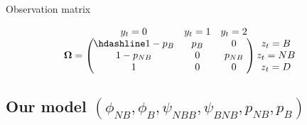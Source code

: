 \documentclass[
  12pt,
]{krantz}
\begin{document}
Observation matrix

\[
\begin{matrix}
& \\
\mathbf{\Omega} =
    \left ( \vphantom{ \begin{matrix} 12 \\ 12 \\ 12 \end{matrix} } \right .
\end{matrix}
\hspace{-1.2em}
\begin{matrix}
    y_t=0 & y_t=1 & y_t=2 \\ \hdashline
1 - p_B & p_B & 0\\
1 - p_{NB} & 0 & p_{NB}\\
1 & 0 & 0
\end{matrix}
\hspace{-0.2em}
\begin{matrix}
& \\
\left . \vphantom{ \begin{matrix} 12 \\ 12 \\ 12 \end{matrix} } \right )
    \begin{matrix}
    z_{t}=B \\ z_{t}=NB \\ z_{t}=D
    \end{matrix}
\end{matrix}
\]

\hypertarget{our-model-phi_nb-phi_b-psi_nbb-psi_bnb-p_nb-p_b}{%
\subsection{\texorpdfstring{Our model \((\phi_{NB}, \phi_B, \psi_{NBB}, \psi_{BNB}, p_{NB}, p_B)\)}{Our model (\textbackslash phi\_\{NB\}, \textbackslash phi\_B, \textbackslash psi\_\{NBB\}, \textbackslash psi\_\{BNB\}, p\_\{NB\}, p\_B)}}\label{our-model-phi_nb-phi_b-psi_nbb-psi_bnb-p_nb-p_b}}
\end{document}
